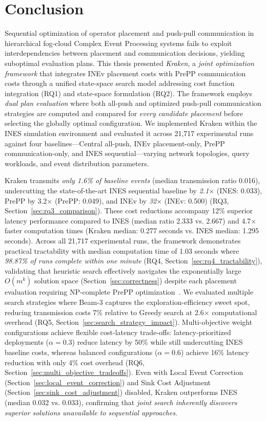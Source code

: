 \chapter{Conclusion\label{cha:conclusion}}

Sequential optimization of operator placement and push-pull communication in hierarchical fog-cloud Complex Event Processing systems fails to exploit interdependencies between placement and communication decisions, yielding suboptimal evaluation plans. This thesis presented \emph{Kraken}, a \emph{joint optimization framework} that integrates INEv placement costs with PrePP communication costs through a unified state-space search model addressing cost function integration (RQ1) and state-space formulation (RQ2). The framework employs \emph{dual plan evaluation} where both all-push and optimized push-pull communication strategies are computed and compared for \emph{every candidate placement} before selecting the globally optimal configuration. We implemented Kraken within the INES simulation environment and evaluated it across 21,717 experimental runs against four baselines—Central all-push, INEv placement-only, PrePP communication-only, and INES sequential—varying network topologies, query workloads, and event distribution parameters.

Kraken transmits \emph{only 1.6\% of baseline events} (median transmission ratio 0.016), undercutting the state-of-the-art INES sequential baseline by \emph{2.1$\times$} (INES: 0.033), PrePP by 3.2$\times$ (PrePP: 0.049), and INEv by \emph{32$\times$} (INEv: 0.500) (RQ3, Section~\ref{sec:rq3_comparison}). These cost reductions accompany 12\% superior latency performance compared to INES (median ratio 2.333 vs. 2.667) and 4.7$\times$ faster computation times (Kraken median: 0.277 seconds vs. INES median: 1.295 seconds). Across all 21,717 experimental runs, the framework demonstrates practical tractability with median computation time of 1.03 seconds where \emph{98.87\% of runs complete within one minute} (RQ4, Section~\ref{sec:rq4_tractability}), validating that heuristic search effectively navigates the exponentially large $O(m^k)$ solution space (Section~\ref{sec:correctness}) despite each placement evaluation requiring NP-complete PrePP optimization~\cite{purtzel_predicate-based_2022}. We evaluated multiple search strategies where Beam-3 captures the exploration-efficiency sweet spot, reducing transmission costs 7\% relative to Greedy search at 2.6$\times$ computational overhead (RQ5, Section~\ref{sec:search_strategy_impact}). Multi-objective weight configurations achieve flexible cost-latency trade-offs: latency-prioritized deployments ($\alpha = 0.3$) reduce latency by 50\% while still undercutting INES baseline costs, whereas balanced configurations ($\alpha = 0.6$) achieve 16\% latency reduction with only 4\% cost overhead (RQ6, Section~\ref{sec:multi_objective_tradeoffs}). Even with Local Event Correction (Section~\ref{sec:local_event_correction}) and Sink Cost Adjustment (Section~\ref{sec:sink_cost_adjustment}) disabled, Kraken outperforms INES (median 0.032 vs. 0.033), confirming that \emph{joint search inherently discovers superior solutions unavailable to sequential approaches}.

